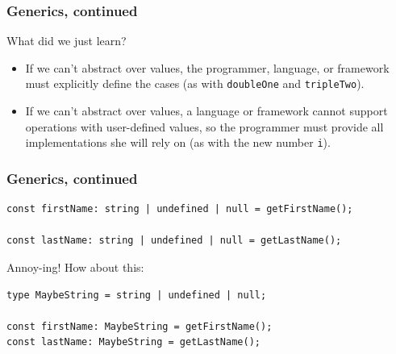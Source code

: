 \documentclass[aspectratio=169]{beamer}
\begin{document}
\begin{frame}[fragile]
  \frametitle{Generics, continued}

  What did we just learn? \\

  \begin{itemize}
    \item If we can't abstract over values, the programmer, language, or
          framework must explicitly define the cases (as with
          \texttt{doubleOne} and \texttt{tripleTwo}).
    \item If we can't abstract over values, a language or framework cannot
          support operations with user-defined values, so the programmer must
          provide all implementations she will rely on (as with the new
          number \texttt{i}).
  \end{itemize}
\end{frame}

\begin{frame}[fragile]
  \frametitle{Generics, continued}

  \begin{verbatim}
const firstName: string | undefined | null = getFirstName();

const lastName: string | undefined | null = getLastName();
  \end{verbatim}

  \vspace{1em}

  Annoy-ing! How about this: \\

  \begin{verbatim}
type MaybeString = string | undefined | null;

const firstName: MaybeString = getFirstName();
const lastName: MaybeString = getLastName();
  \end{verbatim}
\end{frame}
\end{document}

